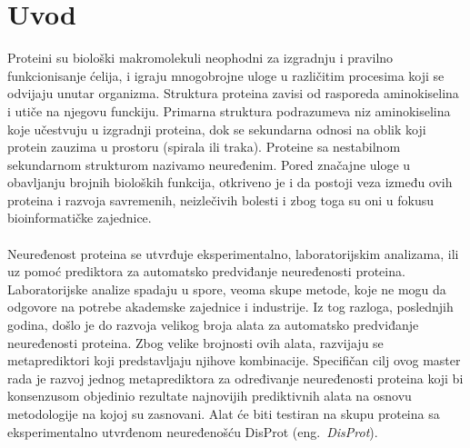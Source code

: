 
\chapter{Uvod} %

\label{Chapter1} %


Proteini su biološki makromolekuli neophodni za izgradnju i pravilno funkcionisanje ćelija, i igraju mnogobrojne uloge u različitim procesima koji se odvijaju unutar organizma. Struktura proteina zavisi od rasporeda aminokiselina i utiče na njegovu funckiju. Primarna struktura podrazumeva niz aminokiselina koje učestvuju u izgradnji proteina, dok se sekundarna odnosi na oblik koji protein zauzima u prostoru (spirala ili traka). Proteine sa nestabilnom sekundarnom strukturom nazivamo neuređenim. Pored značajne uloge u obavljanju brojnih bioloških funkcija, otkriveno je i da postoji veza između ovih proteina i razvoja savremenih, neizlečivih bolesti i zbog toga su oni u fokusu bioinformatičke zajednice.\\\\

Neuređenost proteina se utvrđuje eksperimentalno, laboratorijskim analizama, ili uz pomoć prediktora za automatsko predviđanje neuređenosti proteina. Laboratorijske analize spadaju u spore, veoma skupe metode, koje ne mogu da odgovore na potrebe akademske zajednice i industrije. Iz tog razloga, poslednjih godina, došlo je do razvoja velikog broja alata za automatsko predviđanje neuređenosti proteina. Zbog velike brojnosti ovih alata, razvijaju se metaprediktori koji predstavljaju njihove kombinacije. Specifičan cilj ovog master rada je razvoj jednog metaprediktora za određivanje neuređenosti proteina koji bi konsenzusom objedinio rezultate najnovijih prediktivnih alata na osnovu metodologije na kojoj su zasnovani. Alat će biti testiran na skupu proteina sa eksperimentalno utvrđenom neuređenošću DisProt (eng.~{\em DisProt}).